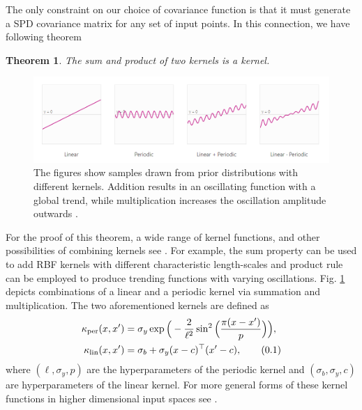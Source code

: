 \documentclass[10pt]{article}
\newtheorem{thm}{Theorem}[section]
\theoremstyle{definition}
\newcommand\eqnum{\addtocounter{equation}{1}\tag{\arabic{section}.\arabic{equation}}}
\begin{document}
The only constraint on our choice of covariance function is that it must generate a SPD covariance matrix for any set of input points. In this connection, we have following theorem
\begin{thm}
The sum and product of two kernels is a kernel.
\end{thm}
\begin{figure}[t!]
\centering
\includegraphics[width=17cm]{figs/combine-kernels.png}
\caption{The figures show samples drawn from prior distributions with different kernels. Addition results in an oscillating function with a global trend, while multiplication increases the oscillation amplitude outwards \cite{Gortler2019}.}
\label{fig:kernels:combine}
\end{figure}
For the proof of this theorem, a wide range of kernel functions, and other possibilities of combining kernels see \cite[Section 4.2]{Rasmussen2006}. For example, the sum property can be used to add RBF kernels with different characteristic length-scales and product rule can be employed to produce trending functions with varying oscillations. Fig. \ref{fig:kernels:combine} depicts combinations of a linear and a periodic kernel via summation and multiplication. The two aforementioned kernels are defined as
\begin{align*}
\kappa_{\text{per}}(x,x') &= \sigma_y\exp\Big(-\frac{2}{\ell^2}\sin^2\Big(\frac{\pi( x-x')}{p}\Big)\Big), \\
\kappa_{\text{lin}}(x, x') &= \sigma_b+\sigma_y(x-c)^{\top}(x'-c),
\eqnum
\end{align*}
where $(\ell, \sigma_y, p)$ are the hyperparameters of the periodic kernel and $(\sigma_b, \sigma_y, c)$ are hyperparameters of the linear kernel. For more general forms of these kernel functions in higher dimensional input spaces see \cite[Section 45.4]{MacKay2003}.
\end{document}
